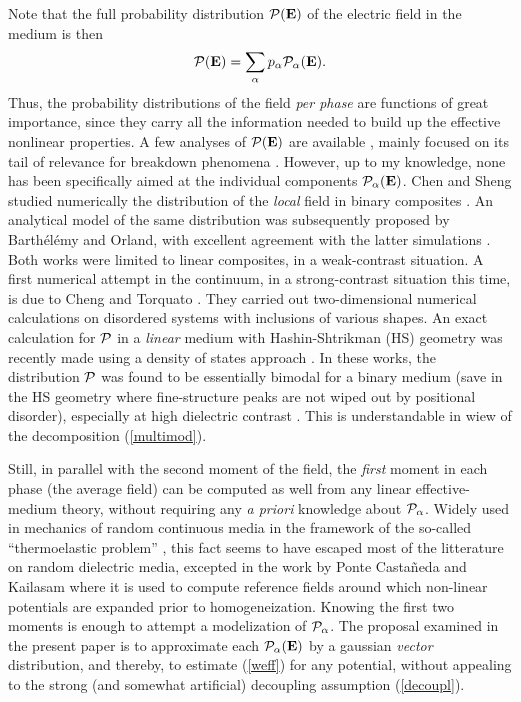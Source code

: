 Note that the full probability distribution ${\cal P}({\mathbf E})$ 
of the electric field in the medium is then
\begin{equation}
\label{multimod}
{\cal P}({\mathbf E})=\sum_\alpha p_\alpha {\cal P}_\alpha({\mathbf E}).
\end{equation}
Thus, the probability distributions of the field {\em per phase} are 
functions of great importance, since they carry all the information 
needed to build up the effective nonlinear properties. A few analyses 
of ${\cal P}({\mathbf E})$ are available \cite{BART97}, mainly focused 
on its tail of relevance for breakdown phenomena \cite{DUXB95}. However, 
up to my knowledge, none has been specifically aimed at the individual 
components ${\cal P}_\alpha({\mathbf E})$. Chen and Sheng studied 
numerically the distribution of the {\em local} field in binary 
composites \cite{CHEN91}. An analytical model of the same distribution 
was subsequently proposed by Barth\'el\'emy and Orland, with excellent 
agreement with the latter simulations \cite{BART97}. Both works were 
limited to linear composites, in a weak-contrast situation. A first 
numerical attempt in the continuum, in a strong-contrast situation 
this time, is due to Cheng and Torquato \cite{CHEN97}. They carried 
out two-dimensional numerical calculations on disordered systems with 
inclusions of various shapes. An exact calculation for ${\cal P}$ in 
a {\em linear} medium with Hashin-Shtrikman (HS) geometry was recently 
made using a density of states approach \cite{CULE98}. In these 
works, the distribution ${\cal P}$ was found to be essentially 
bimodal for a binary medium (save in the HS geometry where 
fine-structure peaks are not wiped out by positional disorder), 
especially at high dielectric contrast \cite{CHEN97}. This is 
understandable in wiew of the decomposition (\ref{multimod}).

Still, in parallel with the second moment of the field, the 
{\em first} moment in each phase (the average field) can be computed 
as well from any linear effective-medium theory, without requiring 
any {\it a priori} knowledge about ${\cal P}_\alpha$. Widely used in 
mechanics of random continuous media in the framework of the 
so-called ``thermoelastic problem'' \cite{WILL81}, this fact seems 
to have escaped most of the litterature on random dielectric media, 
excepted in the work by Ponte Casta\~neda and Kailasam \cite{PONT97} 
where it is used to compute reference fields around which non-linear
 potentials are expanded prior to homogeneization. Knowing the first 
two moments is enough to attempt a modelization of ${\cal P}_\alpha$. 
The proposal examined in the present paper is to approximate each 
${\cal P}_\alpha({\mathbf E})$ by a gaussian {\em vector} 
distribution, and thereby, to estimate (\ref{weff}) for any potential, 
without appealing to the strong (and somewhat artificial) decoupling 
assumption (\ref{decoupl}). 

